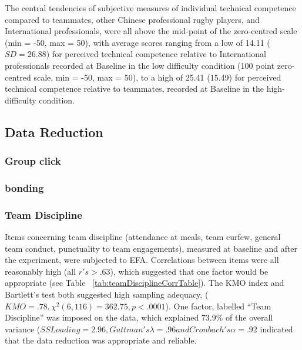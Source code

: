 

The central tendencies of subjective measures of individual technical competence compared to teammates, other Chinese professional rugby players, and International professionals, were all above the mid-point of the zero-centred scale (min = -50, max = 50), with average scores ranging from  a low of 14.11 ($SD = 26.88$) for perceived technical competence relative to International professionals recorded at Baseline in the low difficulty condition (100 point zero-centred scale, min = -50, max = 50), to a high of 25.41 (15.49) for perceived technical competence relative to teammates, recorded at Baseline in the high-difficulty condition.






\subsection{Data Reduction\label{app9:dataReduction}}

\subsubsection{Group click}

  

\subsubsection{bonding}

  


\subsubsection{Team Discipline\label{app9:teamDisciplineEFA}}
Items concerning team discipline (attendance at meals, team curfew, general team conduct, punctuality to team engagements), measured at baseline and after the experiment, were subjected to EFA.  Correlations between items were all reasonably high (all $r's > .63$), which suggested that one factor would be appropriate (see Table ~\ref{tab:teamDisciplineCorrTable}).
The KMO index and Bartlett's test both suggested high sampling adequacy, ($KMO = .78, \chi^2(6, 116) = 362.75, p < .0001$).  One factor, labelled ``Team Discipline'' was imposed on the data, which explained 73.9\% of the overall variance
($ SS Loading = 2.96, Guttman's \lambda = .96 and Cronbach's \alpha = .92$ indicated that the data reduction was appropriate and reliable.


